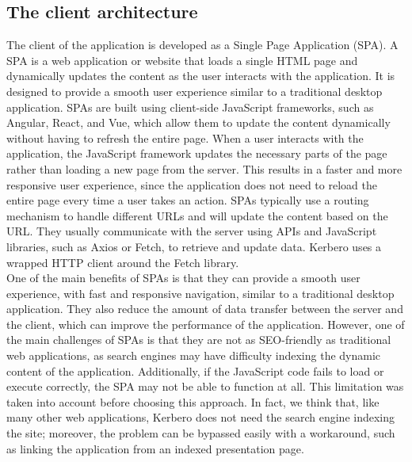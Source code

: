 \subsection{The client architecture}
The client of the application is developed as a Single Page Application (SPA). A SPA is a web application or website that loads a single HTML page and dynamically updates the content as the user interacts with the application. It is designed to provide a smooth user experience similar to a traditional desktop application. SPAs are built using client-side JavaScript frameworks, such as Angular, React, and Vue, which allow them to update the content dynamically without having to refresh the entire page. When a user interacts with the application, the JavaScript framework updates the necessary parts of the page rather than loading a new page from the server. This results in a faster and more responsive user experience, since the application does not need to reload the entire page every time a user takes an action. SPAs typically use a routing mechanism to handle different URLs and will update the content based on the URL. They usually communicate with the server using APIs and JavaScript libraries, such as Axios or Fetch, to retrieve and update data. Kerbero uses a wrapped HTTP client around the Fetch library.
\\ One of the main benefits of SPAs is that they can provide a smooth user experience, with fast and responsive navigation, similar to a traditional desktop application. They also reduce the amount of data transfer between the server and the client, which can improve the performance of the application. However, one of the main challenges of SPAs is that they are not as SEO-friendly as traditional web applications, as search engines may have difficulty indexing the dynamic content of the application. Additionally, if the JavaScript code fails to load or execute correctly, the SPA may not be able to function at all. This limitation was taken into account before choosing this approach. In fact, we think that, like many other web applications, Kerbero does not need the search engine indexing the site; moreover, the problem can be bypassed easily with a workaround, such as linking the application from an indexed presentation page.

